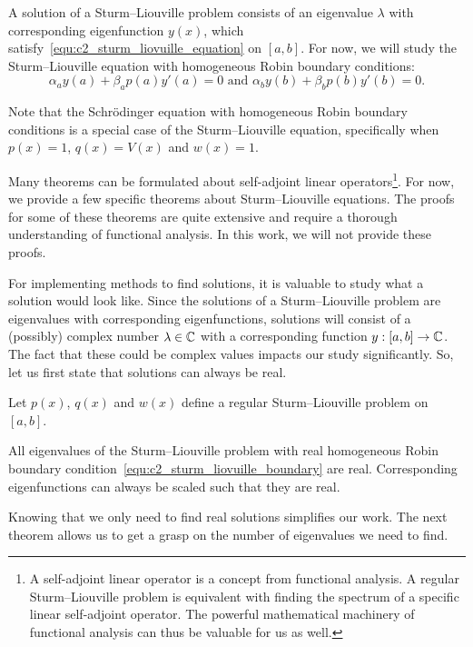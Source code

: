 A solution of a Sturm--Liouville problem consists of an eigenvalue $\lambda$ with corresponding eigenfunction $y(x)$, which satisfy~\eqref{equ:c2_sturm_liovuille_equation} on $[a, b]$. For now, we will study the Sturm--Liouville equation with homogeneous Robin boundary conditions:
\begin{equation}\label{equ:c2_sturm_liovuille_boundary}
    \alpha_a y(a) + \beta_a p(a) y'(a) = 0 \text{ and } \alpha_b y(b) + \beta_b p(b) y'(b) = 0\text{.}
\end{equation}

Note that the Schrödinger equation with homogeneous Robin boundary conditions is a special case of the Sturm--Liouville equation, specifically when $p(x) = 1$, $q(x) = V(x)$ and $w(x) = 1$.

Many theorems can be formulated about self-adjoint linear operators\footnote{A self-adjoint linear operator is a concept from functional analysis. A regular Sturm--Liouville problem is equivalent with finding the spectrum of a specific linear self-adjoint operator. The powerful mathematical machinery of functional analysis can thus be valuable for us as well.}. For now, we provide a few specific theorems about Sturm--Liouville equations. The proofs for some of these theorems are quite extensive and require a thorough understanding of functional analysis. In this work, we will not provide these proofs.

For implementing methods to find solutions, it is valuable to study what a solution would look like. Since the solutions of a Sturm--Liouville problem are eigenvalues with corresponding eigenfunctions, solutions will consist of a (possibly) complex number $\lambda \in \mathbb{C}$ with a corresponding function $y : [a, b] \to \mathbb{C}$. The fact that these could be complex values impacts our study significantly. So, let us first state that solutions can always be real.

\begin{theorem}\label{the:c2_real_eigenvalues}
    Let $p(x)$, $q(x)$ and $w(x)$ define a regular Sturm--Liouville problem on $[a, b]$.

    All eigenvalues of the Sturm--Liouville problem with real homogeneous Robin boundary condition~\eqref{equ:c2_sturm_liovuille_boundary} are real. Corresponding eigenfunctions can always be scaled such that they are real.
\end{theorem}

Knowing that we only need to find real solutions simplifies our work. The next theorem allows us to get a grasp on the number of eigenvalues we need to find.


